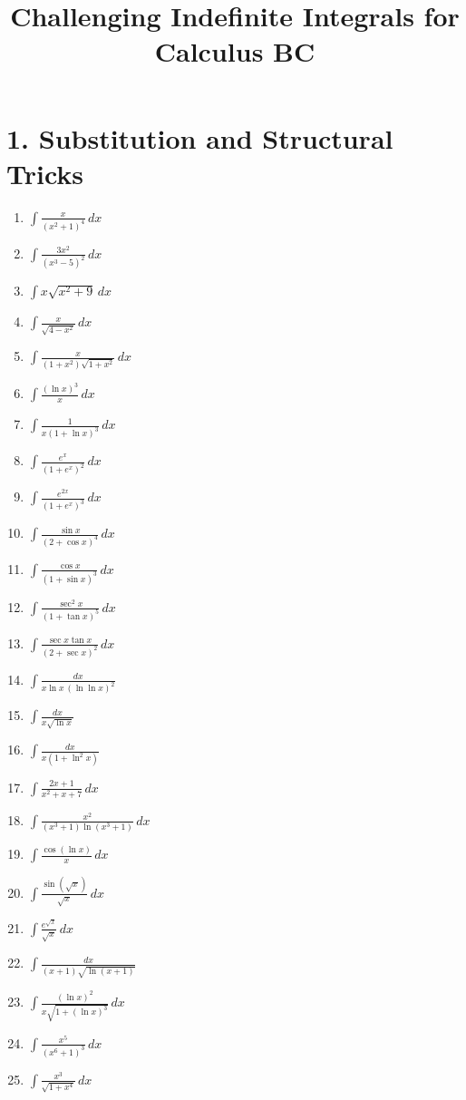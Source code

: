 \documentclass[11pt]{article}
\title{Challenging Indefinite Integrals for Calculus BC}
\author{}
\date{}
\begin{document}
\maketitle

\section*{1. Substitution and Structural Tricks}

\begin{enumerate}
\item $\displaystyle \int \frac{x}{(x^2+1)^4}\,dx$
\item $\displaystyle \int \frac{3x^2}{(x^3-5)^2}\,dx$
\item $\displaystyle \int x\sqrt{x^2+9}\,dx$
\item $\displaystyle \int \frac{x}{\sqrt{4-x^2}}\,dx$
\item $\displaystyle \int \frac{x}{(1+x^2)\sqrt{1+x^2}}\,dx$
\item $\displaystyle \int \frac{(\ln x)^3}{x}\,dx$
\item $\displaystyle \int \frac{1}{x(1+\ln x)^3}\,dx$
\item $\displaystyle \int \frac{e^x}{(1+e^x)^2}\,dx$
\item $\displaystyle \int \frac{e^{2x}}{(1+e^x)^3}\,dx$
\item $\displaystyle \int \frac{\sin x}{(2+\cos x)^4}\,dx$
\item $\displaystyle \int \frac{\cos x}{(1+\sin x)^3}\,dx$
\item $\displaystyle \int \frac{\sec^2 x}{(1+\tan x)^5}\,dx$
\item $\displaystyle \int \frac{\sec x\tan x}{(2+\sec x)^2}\,dx$
\item $\displaystyle \int \frac{dx}{x\ln x\,(\ln\ln x)^2}$
\item $\displaystyle \int \frac{dx}{x\sqrt{\ln x}}$
\item $\displaystyle \int \frac{dx}{x(1+\ln^2 x)}$
\item $\displaystyle \int \frac{2x+1}{x^2+x+7}\,dx$
\item $\displaystyle \int \frac{x^2}{(x^3+1)\ln(x^3+1)}\,dx$
\item $\displaystyle \int \frac{\cos(\ln x)}{x}\,dx$
\item $\displaystyle \int \frac{\sin(\sqrt{x})}{\sqrt{x}}\,dx$
\item $\displaystyle \int \frac{e^{\sqrt{x}}}{\sqrt{x}}\,dx$
\item $\displaystyle \int \frac{dx}{(x+1)\sqrt{\ln(x+1)}}$
\item $\displaystyle \int \frac{(\ln x)^2}{x\sqrt{1+(\ln x)^3}}\,dx$
\item $\displaystyle \int \frac{x^5}{(x^6+1)^3}\,dx$
\item $\displaystyle \int \frac{x^3}{\sqrt{1+x^4}}\,dx$
\end{enumerate}
\end{document}
